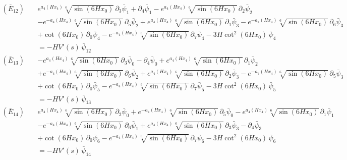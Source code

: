 \begin{align*}
(\bar E_{12})\quad & e^{a_4\left(H x_4\right)} \sqrt[6]{\sin \left(6 H x_0\right)}\,\partial_{3}\bar\psi_{1} + \partial_{4}\bar\psi_{1} - e^{a_4\left(H x_4\right)} \sqrt[6]{\sin \left(6 H x_0\right)}\,\partial_{2}\bar\psi_{2} \\
 &  - e^{-a_4\left(H x_4\right)} \sqrt[6]{\sin \left(6 H x_0\right)}\,\partial_{5}\bar\psi_{2} + e^{a_4\left(H x_4\right)} \sqrt[6]{\sin \left(6 H x_0\right)}\,\partial_{1}\bar\psi_{3} - e^{-a_4\left(H x_4\right)} \sqrt[6]{\sin \left(6 H x_0\right)}\,\partial_{6}\bar\psi_{3} \\
 &  + \cot \left(6 H x_0\right)\,\partial_{0}\bar\psi_{4} - e^{-a_4\left(H x_4\right)} \sqrt[6]{\sin \left(6 H x_0\right)}\,\partial_{7}\bar\psi_{4} - 3 H \cot ^2\left(6 H x_0\right)\,\bar\psi_{4} \\
 & = -H V'(s)\,\bar\psi_{12}
\end{align*}
\begin{align*}
(\bar E_{13})\quad & -e^{a_4\left(H x_4\right)} \sqrt[6]{\sin \left(6 H x_0\right)}\,\partial_{3}\bar\psi_{0} - \partial_{4}\bar\psi_{0} + e^{a_4\left(H x_4\right)} \sqrt[6]{\sin \left(6 H x_0\right)}\,\partial_{1}\bar\psi_{2} \\
 &  + e^{-a_4\left(H x_4\right)} \sqrt[6]{\sin \left(6 H x_0\right)}\,\partial_{6}\bar\psi_{2} + e^{a_4\left(H x_4\right)} \sqrt[6]{\sin \left(6 H x_0\right)}\,\partial_{2}\bar\psi_{3} - e^{-a_4\left(H x_4\right)} \sqrt[6]{\sin \left(6 H x_0\right)}\,\partial_{5}\bar\psi_{3} \\
 &  + \cot \left(6 H x_0\right)\,\partial_{0}\bar\psi_{5} - e^{-a_4\left(H x_4\right)} \sqrt[6]{\sin \left(6 H x_0\right)}\,\partial_{7}\bar\psi_{5} - 3 H \cot ^2\left(6 H x_0\right)\,\bar\psi_{5} \\
 & = -H V'(s)\,\bar\psi_{13}
\end{align*}
\begin{align*}
(\bar E_{14})\quad & e^{a_4\left(H x_4\right)} \sqrt[6]{\sin \left(6 H x_0\right)}\,\partial_{2}\bar\psi_{0} + e^{-a_4\left(H x_4\right)} \sqrt[6]{\sin \left(6 H x_0\right)}\,\partial_{5}\bar\psi_{0} - e^{a_4\left(H x_4\right)} \sqrt[6]{\sin \left(6 H x_0\right)}\,\partial_{1}\bar\psi_{1} \\
 &  - e^{-a_4\left(H x_4\right)} \sqrt[6]{\sin \left(6 H x_0\right)}\,\partial_{6}\bar\psi_{1} + e^{a_4\left(H x_4\right)} \sqrt[6]{\sin \left(6 H x_0\right)}\,\partial_{3}\bar\psi_{3} - \partial_{4}\bar\psi_{3} \\
 &  + \cot \left(6 H x_0\right)\,\partial_{0}\bar\psi_{6} - e^{-a_4\left(H x_4\right)} \sqrt[6]{\sin \left(6 H x_0\right)}\,\partial_{7}\bar\psi_{6} - 3 H \cot ^2\left(6 H x_0\right)\,\bar\psi_{6} \\
 & = -H V'(s)\,\bar\psi_{14}
\end{align*}

